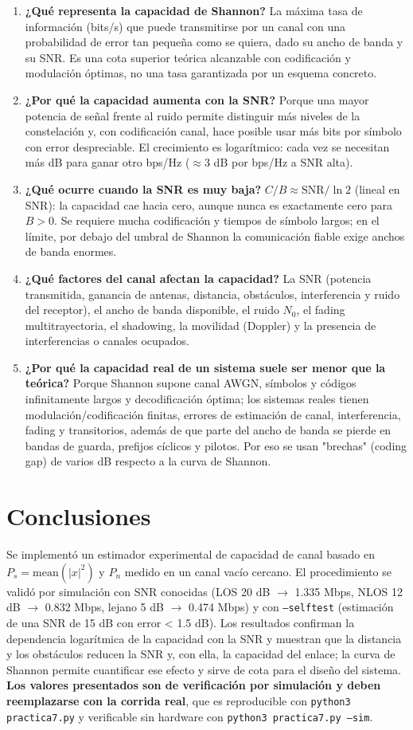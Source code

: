 \documentclass[11pt,a4paper]{article}
\begin{document}
\begin{enumerate}
  \item \textbf{¿Qué representa la capacidad de Shannon?} La máxima tasa de información (bits/s) que puede transmitirse por un canal con una probabilidad de error tan pequeña como se quiera, dado su ancho de banda y su SNR. Es una cota superior teórica alcanzable con codificación y modulación óptimas, no una tasa garantizada por un esquema concreto.
  \item \textbf{¿Por qué la capacidad aumenta con la SNR?} Porque una mayor potencia de señal frente al ruido permite distinguir más niveles de la constelación y, con codificación canal, hace posible usar más bits por símbolo con error despreciable. El crecimiento es logarítmico: cada vez se necesitan más dB para ganar otro bps/Hz ($\approx$3 dB por bps/Hz a SNR alta).
  \item \textbf{¿Qué ocurre cuando la SNR es muy baja?} $C/B \approx \mathrm{SNR}/\ln 2$ (lineal en SNR): la capacidad cae hacia cero, aunque nunca es exactamente cero para $B>0$. Se requiere mucha codificación y tiempos de símbolo largos; en el límite, por debajo del umbral de Shannon la comunicación fiable exige anchos de banda enormes.
  \item \textbf{¿Qué factores del canal afectan la capacidad?} La SNR (potencia transmitida, ganancia de antenas, distancia, obstáculos, interferencia y ruido del receptor), el ancho de banda disponible, el ruido $N_0$, el fading multitrayectoria, el shadowing, la movilidad (Doppler) y la presencia de interferencias o canales ocupados.
  \item \textbf{¿Por qué la capacidad real de un sistema suele ser menor que la teórica?} Porque Shannon supone canal AWGN, símbolos y códigos infinitamente largos y decodificación óptima; los sistemas reales tienen modulación/codificación finitas, errores de estimación de canal, interferencia, fading y transitorios, además de que parte del ancho de banda se pierde en bandas de guarda, prefijos cíclicos y pilotos. Por eso se usan "brechas" (coding gap) de varios dB respecto a la curva de Shannon.
\end{enumerate}

\section{Conclusiones}

Se implementó un estimador experimental de capacidad de canal basado en $P_s = \mathrm{mean}(|x|^2)$ y $P_n$ medido en un canal vacío cercano. El procedimiento se validó por simulación con SNR conocidas (LOS 20 dB $\rightarrow$ 1.335 Mbps, NLOS 12 dB $\rightarrow$ 0.832 Mbps, lejano 5 dB $\rightarrow$ 0.474 Mbps) y con \texttt{--selftest} (estimación de una SNR de 15 dB con error < 1.5 dB). Los resultados confirman la dependencia logarítmica de la capacidad con la SNR y muestran que la distancia y los obstáculos reducen la SNR y, con ella, la capacidad del enlace; la curva de Shannon permite cuantificar ese efecto y sirve de cota para el diseño del sistema. \textbf{Los valores presentados son de verificación por simulación y deben reemplazarse con la corrida real}, que es reproducible con \texttt{python3 practica7.py} y verificable sin hardware con \texttt{python3 practica7.py --sim}.
\end{document}
